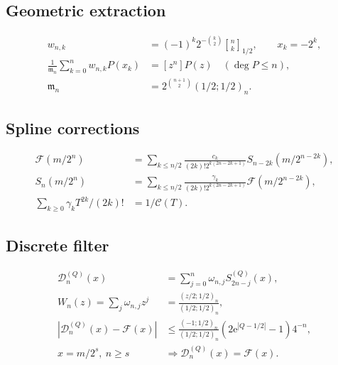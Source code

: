 \documentclass[11pt,oneside]{article}
\theoremstyle{definition}
\theoremstyle{remark}
\newcommand{\e}{\mathrm e}
\newcommand{\qbinom}[3]{\genfrac{[}{]}{0pt}{}{#1}{#2}_{#3}}
\begin{document}
\subsection*{Geometric extraction}
\begin{align*}
 w_{n,k}&=(-1)^k2^{-\binom k2}\qbinom nk{1/2},
 \qquad x_k=-2^k,\\
 \frac1{\mathfrak m_n}\sum_{k=0}^{n}w_{n,k}P(x_k)&=[z^n]P(z)
 \quad(\deg P\le n),\\
 \mathfrak m_n&=2^{\binom{n+1}{2}}(1/2;1/2)_n.
\end{align*}

\subsection*{Spline corrections}
\begin{align*}
 \mathcal F(m/2^n)
 &=\sum_{k\le n/2}
 \frac{c_k}{(2k)!2^{k(2n-2k+1)}}
 S_{n-2k}(m/2^{n-2k}),\\
 S_n(m/2^n)
 &=\sum_{k\le n/2}
 \frac{\gamma_k}{(2k)!2^{k(2n-2k+1)}}
 \mathcal F(m/2^{n-2k}),\\
 \sum_{k\ge0}\gamma_kT^{2k}/(2k)!&=1/\mathscr C(T).
\end{align*}

\subsection*{Discrete filter}
\begin{align*}
 \mathcal D_n^{(Q)}(x)&=\sum_{j=0}^{n}\omega_{n,j}S_{2n-j}^{(Q)}(x),\\
 W_n(z)=\sum_j\omega_{n,j}z^j
 &=\frac{(z/2;1/2)_n}{(1/2;1/2)_n},\\
 |\mathcal D_n^{(Q)}(x)-\mathcal F(x)|
 &\le\frac{(-1;1/2)_n}{(1/2;1/2)_n}
 (2\e^{|Q-1/2|}-1)4^{-n},\\
 x=m/2^s,\ n\ge s&\Longrightarrow
 \mathcal D_n^{(Q)}(x)=\mathcal F(x).
\end{align*}
\end{document}
